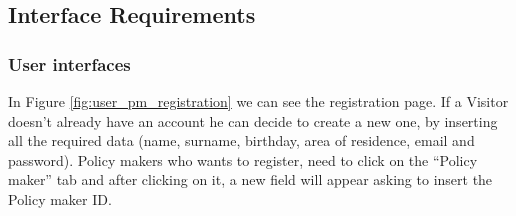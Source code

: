 \subsection{Interface Requirements}


\subsubsection{User interfaces}
In Figure \ref{fig:user_pm_registration} we can see the registration page. If a Visitor doesn’t already have an account he can decide to create a new one, by inserting all the required data (name, surname, birthday, area of residence, email and password). Policy makers who wants to register, need to click on the “Policy maker” tab and after clicking on it, a new field will appear asking to insert the Policy maker ID.\\
